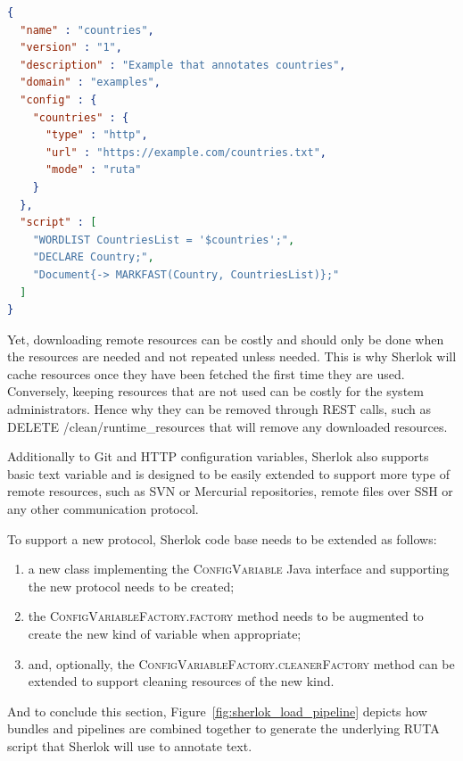 \documentclass{article}
\newcommand{\ID}[1]{{\textsc{#1}}}
\newcommand{\REST}[1]{\textsf{#1}}
\begin{document}
\begin{lstlisting}[float,language=json,
                   caption=Configuration of the \ID{countries} pipeline.,
                   label=lst:countries_pipeline_config]
{
  "name" : "countries",
  "version" : "1",
  "description" : "Example that annotates countries",
  "domain" : "examples",
  "config" : {
    "countries" : {
      "type" : "http",
      "url" : "https://example.com/countries.txt",
      "mode" : "ruta"
    }
  },
  "script" : [
    "WORDLIST CountriesList = '$countries';",
    "DECLARE Country;",
    "Document{-> MARKFAST(Country, CountriesList)};"
  ]
}
\end{lstlisting}

Yet, downloading remote resources can be costly and should only be done when the resources are
needed and not repeated unless needed. This is why Sherlok will cache resources once they have been
fetched the first time they are used. Conversely, keeping resources that are not used can be costly
for the system administrators. Hence why they can be removed through REST calls, such as \REST{DELETE
/clean/runtime\_resources} that will remove any downloaded resources.

Additionally to Git and HTTP configuration variables, Sherlok also supports basic text variable and
is designed to be easily extended to support more type of remote resources, such as SVN or Mercurial
repositories, remote files over SSH or any other communication protocol.

To support a new protocol, Sherlok code base needs to be extended as follows:

\begin{enumerate}
    \item a new class implementing the \ID{ConfigVariable} Java interface and supporting the new
        protocol needs to be created;
    \item the \ID{ConfigVariableFactory.factory} method needs to be augmented to create the new kind of
        variable when appropriate;
    \item and, optionally, the \ID{ConfigVariableFactory.cleanerFactory} method can be extended to
        support cleaning resources of the new kind.
\end{enumerate}

And to conclude this section, Figure~\ref{fig:sherlok_load_pipeline} depicts how bundles and pipelines
are combined together to generate the underlying RUTA script that Sherlok will use to annotate text.
\end{document}
